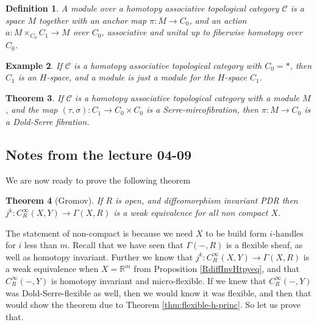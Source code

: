 \documentclass{article}
\newtheorem{theorem}{Theorem}[section]
\newtheorem{definition}[theorem]{Definition}
\newtheorem{example}[theorem]{Example}
\newtheorem{proposed work}[theorem]{Proposed Work}
\theoremstyle{definition}
\begin{document}
\begin{definition}
A module over a homotopy associative topological category $\mathcal{C}$ is a space $M$ together with an anchor map $\pi: M\to C_0$, and an action $a: M\times_{C_0} C_1 \to M$ over $C_0$, associative and unital up to fiberwise homotopy over $C_0$.
\end{definition}

\begin{example}
If $\mathcal{C}$ is a homotopy associative topological category with $C_0=*$, then $C_1$ is an $H$-space, and a module is just a module for the $H$-space $C_1$. 
\end{example}

\begin{theorem}\label{Fib&HATCat}
If $\mathcal{C}$ is a homotopy associative topological category with a module $M$, and the map $(\tau, \sigma): C_1\to C_0 \times C_0$ is a Serre-mircofibration, then $\pi :M\to C_0$ is a Dold-Serre fibration.
\end{theorem}

\subsection{Notes from the lecture 04-09}
We are now ready to prove the following theorem
\begin{theorem}[Gromov]\label{thm:Gromov} If $R$ is open, and diffeomorphism invariant PDR then $j^k: C_R^\infty(X,Y)\to \Gamma(X, R)$ is a weak equivalence for all non compact $X$.
\end{theorem}
The statement of non-compact is because we need $X$ to be build form $i$-handles for $i$ less than $m$. Recall that we have seen that $\Gamma(-,R)$ is a flexible sheaf, as well as homotopy invariant. Further we know that $j^k: C_R^\infty(X,Y)\to \Gamma(X, R)$ is a weak equivalence when $X=\mathbb{R}^m$ from Proposition \ref{RdiffInvHtpyeq}, and that $C^\infty_R(-,Y)$ is homotopy invariant and micro-flexible. If we knew that $C^\infty_R(-,Y)$ was Dold-Serre-flexible as well, then we would know it was flexible, and then that would show the theorem due to Theorem \ref{thm:flexible-h-princ}. So let us prove that.
\end{document}
